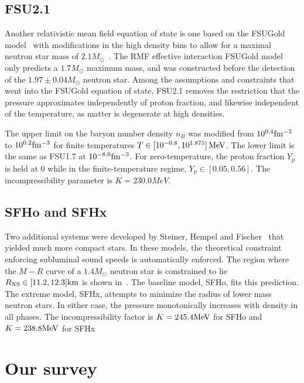 \subsection{FSU2.1}
\label{sec:fsu21}

Another relativistic mean field equation of state is one based on the FSUGold model~\cite{todd2005neutron} with modifications in the high density bins to allow for a maximal neutron star mass of $2.1 M_\odot$~\cite{shen2011second}.  The RMF effective interaction FSUGold model only predicts a $1.7 M_\odot$ maximum mass, and was constructed before the detection of the $1.97 \pm 0.04 M_\odot$ neutron star.
Among the assumptions and constraints that went into the FSUGold equation of state, FSU2.1 removes the restriction that the pressure approximates independently of proton fraction, and likewise independent of the temperature, as matter is degenerate at high densities.

The upper limit on the baryon number density $n_B$ was modified from $10^{0.4} {\rm fm^{-3}}$ to $10^{0.2} {\rm fm^{-3}}$ for finite temperatures $T \in [10^{-0.8} , 10^{1.875}]\, {\rm MeV}$.  The lower limit is the same as FSU1.7 at $10^{-8.0} {\rm fm^{-3}}$.  For zero-temperature, the proton fraction $Y_p$ is held at $0$ while in the finite-temperature regime, $Y_p \in [0.05 , 0.56]$.  The incompressibility parameter is $K = 230.0 MeV$.  

\subsection{SFHo and SFHx}
\label{sec:sfh}

Two additional systems were developed by Steiner, Hempel and Fischer~\cite{steiner2013core} that yielded much more compact stars.
In these models, the theoretical constraint enforcing subluminal sound speeds is automatically enforced.  The region where the $M-R$ curve of a $1.4 M_\odot$ neutron star is constrained to lie $R_{\rm NS} \in [11.2,12.3] {\rm km}$ is shown in~\cite{steiner6871apjl}.
The baseline model, SFHo, fits this prediction.  The extreme model, SFHx, attempts to minimize the radius of lower mass neutron stars.  In either case, the pressure monotonically increases with density in all phases.
The incompressibility factor is $K = 245.4 {\rm MeV}$ for SFHo and $K = 238.8 {\rm MeV}$ for SFHx

\section{Our survey}

